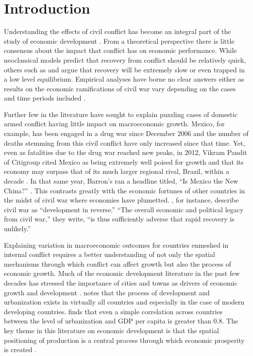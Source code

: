 
\section{Introduction}
\label{intro}

Understanding the effects of civil conflict has become an integral part of the study of economic development \citep{serneels:verpoorten:2013}. From a theoretical perspective there is little consensus about the impact that conflict has on economic performance. While neoclassical models predict that recovery from conflict should be relatively quick, others such as \citet{barro:martin:2004} and \citet{sachs:2006} argue that recovery will be extremely slow or even trapped in a low level equilibrium. Empirical analyses have borne no clear answers either as results on the economic ramifications of civil war vary depending on the cases and time periods included \citep{kang:meernik:2005}. 

Further few in the literature have sought to explain puzzling cases of domestic armed conflict having little impact on macroeconomic growth. Mexico, for example, has been engaged in a drug war since December 2006 and the number of deaths stemming from this civil conflict have only increased since that time. Yet, even as fatalities due to the drug war reached new peaks, in 2012, Vikram Pandit of Citigroup cited Mexico as being extremely well poised for growth and that its economy may surpass that of its much larger regional rival, Brazil, within a decade \citep{vardi:2012}. In that same year, Barron's ran a headline titled, ``Is Mexico the New China?'' \citep{kapadia:2012}. This contrasts greatly with the economic fortunes of other countries in the midst of civil war where economies have plumetted. \cite{collier:elliott:etal:2003}, for instance, describe civil war as ``development in reverse.'' ``The overall economic and political legacy from civil war,'' they write, ``is thus sufficiently adverse that rapid recovery is unlikely.''  

Explaining variation in macroeconomic outcomes for countries enmeshed in internal conflict requires a better understanding of not only the spatial mechanisms through which conflict can affect growth but also the process of economic growth. Much of the economic development literature in the past few decades has stressed the importance of cities and towns as drivers of economic growth and development \citep{hanson:2005}. \citet{venables:2005} notes that the process of development and urbanization exists in virtually all countries and especially in the case of modern developing countries. \citet{henderson:2000} finds that even a simple correlation across countries between the level of urbanization and GDP per capita is greater than 0.8. The key theme in this literature on economic development is that the spatial positioning of production is a central process through which economic prosperity is created \citep{krugman:1991}.

